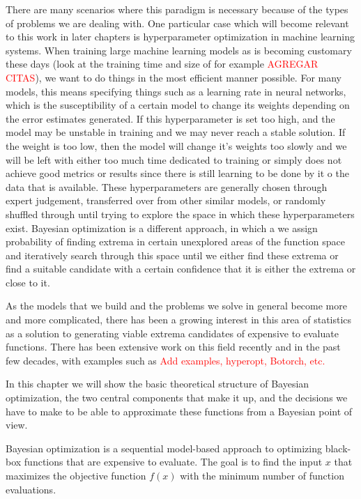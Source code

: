 There are many scenarios where this paradigm is necessary because of the types of problems we are dealing with. One particular case which will become relevant to this work in later chapters is hyperparameter optimization in machine learning systems. When training large machine learning models as is becoming customary these days (look at the training time and size of for example \textcolor{red}{AGREGAR CITAS}), we want to do things in the most efficient manner possible. For many models, this means specifying things such as a learning rate in neural networks, which is the susceptibility of a certain model to change its weights depending on the error estimates generated. If this hyperparameter is set too high, and the model may be unstable in training and we may never reach a stable solution. If the weight is too low, then the model will change it's weights too slowly and we will be left with either too much time dedicated to training or simply does not achieve good metrics or results since there is still learning to be done by it o the data that is available. These hyperparameters are generally chosen through expert judgement, transferred over from other similar models, or randomly shuffled through until trying to explore the space in which these hyperparameters exist. Bayesian optimization is a different approach, in which a we assign probability of finding extrema in certain unexplored areas of the function space and iteratively search through this space until we either find these extrema or find a suitable candidate with a certain confidence that it is either the extrema or close to it. 

As the models that we build and the problems we solve in general become more and more complicated, there has been a growing interest in this area of statistics as a solution to generating viable extrema candidates of expensive to evaluate functions. There has been extensive work on this field recently and in the past few decades, with examples such as \textcolor{red}{Add examples, hyperopt, Botorch, etc.}

In this chapter we will show the basic theoretical structure of Bayesian optimization, the two central components that make it up, and the decisions we have to make to be able to approximate these functions from a Bayesian point of view. 

Bayesian optimization is a sequential model-based approach to optimizing black-box functions that are expensive to evaluate. The goal is to find the input $x$ that maximizes the objective function $f(x)$ with the minimum number of function evaluations.

